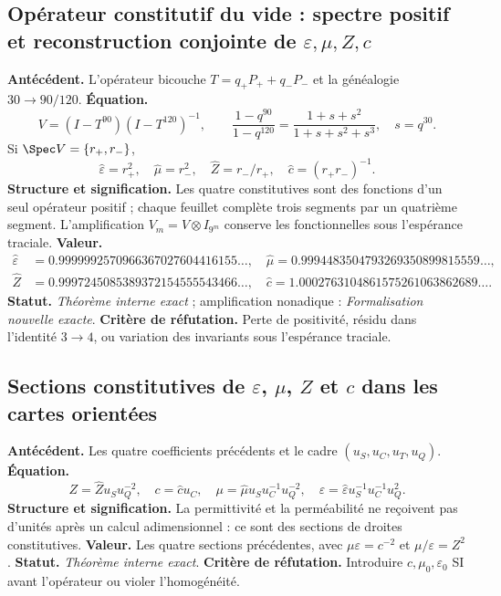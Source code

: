 \subsection*{Opérateur constitutif du vide : spectre positif et reconstruction conjointe de \(\varepsilon,\mu,Z,c\)}
\textbf{Antécédent.} L'opérateur bicouche \(T=q_+P_++q_-P_-\) et la généalogie
\(30\to90/120\). \textbf{Équation.}
\[
V=(I-T^{90})(I-T^{120})^{-1},
\qquad
\frac{1-q^{90}}{1-q^{120}}
=\frac{1+s+s^2}{1+s+s^2+s^3},\quad s=q^{30}.
\]
Si \(\Spec V=\{r_+,r_-\}\),
\[
\widehat\varepsilon=r_+^2,
\quad\widehat\mu=r_-^2,
\quad\widehat Z=r_-/r_+,
\quad\widehat c=(r_+r_-)^{-1}.
\]
\textbf{Structure et signification.} Les quatre constitutives sont des fonctions
d'un seul opérateur positif ; chaque feuillet complète trois segments par un quatrième segment.
L'amplification \(V_m=V\otimes I_{9^m}\) conserve les fonctionnelles sous
l'espérance traciale.
\textbf{Valeur.}
\begin{align*}
\widehat\varepsilon&=0.9999992570966367027604416155\ldots,\quad
\widehat\mu=0.9994483504793269350899815559\ldots,\\
\widehat Z&=0.9997245085389372154555543466\ldots,\quad
\widehat c=1.0002763104861575261063862689\ldots.
\end{align*}
\textbf{Statut.} \emph{Théorème interne exact} ; amplification nonadique :
\emph{Formalisation nouvelle exacte}. \textbf{Critère de réfutation.} Perte de
positivité, résidu dans l'identité \(3\to4\), ou variation des
invariants sous l'espérance traciale.

\subsection*{Sections constitutives de \(\varepsilon\), \(\mu\), \(Z\) et \(c\) dans les cartes orientées}
\textbf{Antécédent.} Les quatre coefficients précédents et le cadre
\((u_S,u_C,u_T,u_Q)\). \textbf{Équation.}
\[
Z=\widehat Zu_Su_Q^{-2},\quad c=\widehat cu_C,\quad
\mu=\widehat\mu u_Su_C^{-1}u_Q^{-2},\quad
\varepsilon=\widehat\varepsilon u_S^{-1}u_C^{-1}u_Q^2.
\]
\textbf{Structure et signification.} La permittivité et la perméabilité ne
reçoivent pas d'unités après un calcul adimensionnel : ce sont des sections de droites
constitutives. \textbf{Valeur.} Les quatre sections précédentes, avec
\(\mu\varepsilon=c^{-2}\) et \(\mu/\varepsilon=Z^2\).
\textbf{Statut.} \emph{Théorème interne exact}. \textbf{Critère de réfutation.} Introduire
\(c,\mu_0,\varepsilon_0\) SI avant l'opérateur ou violer l'homogénéité.

